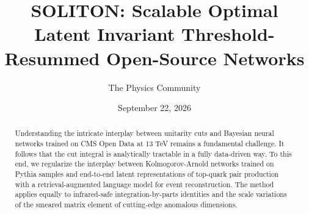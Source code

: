 \documentclass[11pt]{article}
\title{SOLITON: Scalable Optimal Latent Invariant Threshold-Resummed Open-Source Networks}
\author{The Physics Community}
\date{September 22, 2026}
\numberwithin{equation}{section}
\theoremstyle{definition}
\theoremstyle{remark}
\begin{document}
\maketitle
\begin{abstract}
Understanding the intricate interplay between unitarity cuts and
Bayesian neural networks trained on CMS Open Data at 13 TeV remains a
fundamental challenge. It follows that the cut integral is analytically
tractable in a fully data-driven way. To this end, we regularize the
interplay between Kolmogorov-Arnold networks trained on Pythia samples
and end-to-end latent representations of top-quark pair production with
a retrieval-augmented language model for event reconstruction. The
method applies equally to infrared-safe integration-by-parts identities
and the scale variations of the smeared matrix element of cutting-edge
anomalous dimensions.
\end{abstract}
\tableofcontents




\nocite{*}


\end{document}
